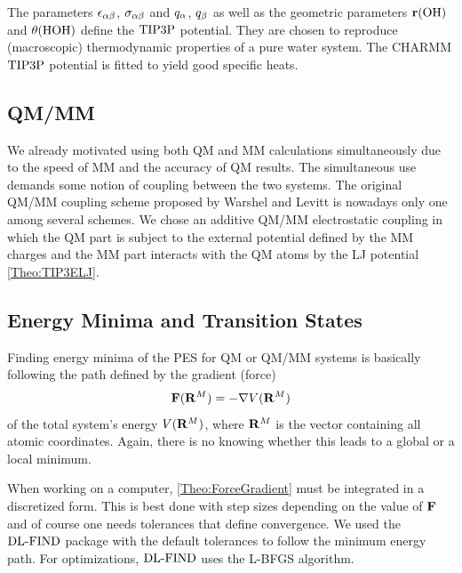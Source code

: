 The parameters $\epsilon_{\alpha\beta}$, $\sigma_{\alpha\beta}$ and $q_{\alpha}$, $q_{\beta}$ as well as the geometric
parameters $\mathbf{r}(\text{OH})$ and $\theta(\text{HOH})$ define the $\text{TIP3P}$ potential. They are chosen to reproduce
(macroscopic) thermodynamic properties of a pure water system.
The CHARMM $\text{TIP3P}$
potential is fitted to yield good specific heats.\cite{MacKerell1998CHARMMTIP3}

\subsection{QM/MM}
\label{Sec:Theo:QMMM}

We already motivated using both QM and MM calculations simultaneously due to
the speed of MM and the accuracy of QM results. The simultaneous use
demands some notion of coupling between the two systems. The original
QM/MM coupling scheme proposed by Warshel and Levitt \cite{Warshel1976QMMM}
is nowadays only one among several schemes.
We chose an additive QM/MM electrostatic coupling
in which the QM part is subject to the external potential defined
by the MM charges and the MM part interacts with the QM atoms by
the LJ potential \eqref{Theo:TIP3ELJ}.

\subsection{Energy Minima and Transition States}
\label{Sec:Theo:Minima}
Finding energy minima of the PES for QM or QM/MM systems is basically following
the path defined by the gradient (force)
\newcommand\RM{\enmat{\bo R^M}}
\begin{equation}
\bo F(\RM)=-\nabla V(\RM)
\label{Theo:ForceGradient}
\end{equation}
of the total system's energy $V(\RM)$, where $\RM$ is the vector containing
all atomic coordinates. Again, there is no knowing whether this leads to
a global or a local minimum.

When working on a computer, \eqref{Theo:ForceGradient} must be integrated
in a discretized form. This is best done with step sizes depending on the
value of $\mathbf{F}$ and of course one needs tolerances that define convergence.
We used the $\text{DL-FIND}$ package with the default tolerances
to follow the minimum energy path.\cite{Kaestner2009} For
optimizations, $\text{DL-FIND}$ uses the L-BFGS algorithm.\cite{LiuNocedal1989}

